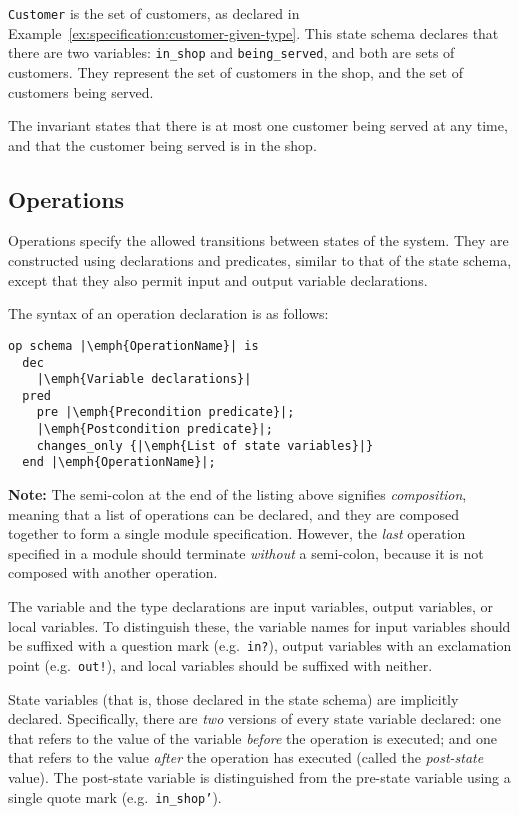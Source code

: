 \texttt{Customer} is the set of customers, as declared in Example~\ref{ex:specification:customer-given-type}.  This state schema declares that there are two variables: \texttt{in\_shop} and \texttt{being\_served}, and both are sets of customers. They represent the set of customers in the shop, and the set of customers being served.

 The invariant states that there is at most one customer being served at any time, and that the customer being served is in the shop.


\subsection{Operations}

Operations specify the allowed transitions between states of the system. They are constructed using declarations and predicates, similar to that of the state schema, except that they also permit input and output variable declarations.

The syntax of an operation declaration is as follows:

\lstset{aboveskip=3mm}
\begin{lstlisting}[escapeinside={||}]
  op schema |\emph{OperationName}| is
  dec
    |\emph{Variable declarations}|
  pred
    pre |\emph{Precondition predicate}|;
    |\emph{Postcondition predicate}|;
    changes_only {|\emph{List of state variables}|}
  end |\emph{OperationName}|;
\end{lstlisting}

\textbf{Note:} The semi-colon at the end of the listing above signifies \emph{composition}, meaning that a list of operations can be declared, and they are composed together to form a single module specification. However, the \emph{last} operation specified in a module should terminate \emph{without} a semi-colon, because it is not composed with another operation.

The variable and the type declarations are input variables, output variables, or local variables. To distinguish these, the variable names for input variables should be suffixed with a question mark (e.g.\ \texttt{in?}), output variables with an exclamation point (e.g.\ \texttt{out!}), and local variables should be suffixed with  neither. 

State variables (that is, those declared in the state schema) are implicitly declared. Specifically, there are \emph{two} versions of every state variable declared: one that refers to the value of the variable \emph{before} the operation is executed; and one that refers to the value \emph{after} the operation has executed (called the \emph{post-state} value). The post-state variable is distinguished from the pre-state variable using a single quote mark (e.g.\ \texttt{in\_shop'}).

